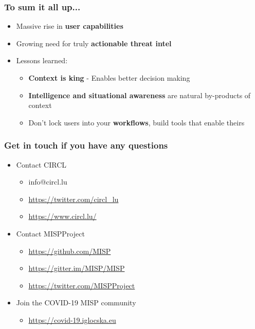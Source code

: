 \begin{frame}
  \frametitle{To sum it all up...}
  \begin{itemize}
     \item Massive rise in {\bf user capabilities}
     \item Growing need for truly {\bf actionable threat intel}
     \item Lessons learned:
     \begin{itemize}
	\item {\bf Context is king} - Enables better decision making
        \item {\bf Intelligence and situational awareness} are natural by-products of context
        \item Don't lock users into your {\bf workflows}, build tools that enable theirs
     \end{itemize}
  \end{itemize}
\end{frame}

\begin{frame}
  \frametitle{Get in touch if you have any questions}
  \begin{itemize}
    \item Contact CIRCL
    \begin{itemize}
      \item info@circl.lu
      \item \url{https://twitter.com/circl_lu}
      \item \url{https://www.circl.lu/}
    \end{itemize}
    \item Contact MISPProject 
    \begin{itemize}
      \item \url{https://github.com/MISP}
      \item \url{https://gitter.im/MISP/MISP}
      \item \url{https://twitter.com/MISPProject}
    \end{itemize}
    \item Join the COVID-19 MISP community
    \begin{itemize}
      \item \url{https://covid-19.iglocska.eu}
    \end{itemize}
  \end{itemize}
\end{frame}

